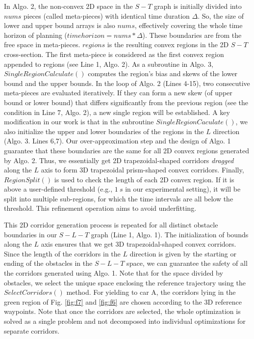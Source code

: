 \documentclass[journal,a4paper,onecolumn,12pt]{IEEEtran}
\begin{document}
In Algo. 2, the non-convex 2D space in the $S-T$ graph is initially divided into $nums$ pieces (called meta-pieces) with identical time duration $\Delta$. So, the size of lower and upper bound arrays is also $nums$, effectively covering the whole time horizon of planning ($time horizon = nums * \Delta$). These boundaries are from the free space in meta-pieces. $regions$ is the resulting convex regions in the 2D $S-T$ cross-section. The first meta-piece is considered as the first convex region appended to regions (see Line 1, Algo. 2). As a subroutine in Algo. 3, $SingleRegionCalculate()$ computes the region's bias and skews of the lower bound and the upper bounds. In the loop of Algo. 2 (Lines 4-15), two consecutive meta-pieces are evaluated iteratively. If they can form a new skew (of upper bound or lower bound) that differs significantly from the previous region (see the condition in Line 7, Algo. 2), a new single region will be established.
A key modification in our work is that in the subroutine $SingleRegionCaculate()$, we also initialize the upper and lower boundaries of the regions in the $L$ direction (Algo. 3. Lines 6,7). Our over-approximation step and the design of Algo. 1 guarantee that these boundaries are the same for all 2D convex regions generated by Algo. 2. Thus, we essentially get 2D trapezoidal-shaped corridors \textit{dragged} along the $L$ axis to form 3D trapezoidal prism-shaped convex corridors. Finally, $RegionSplit()$ is used to check the length of each 2D convex region. If it is above a user-defined threshold (e.g., $1\ s$ in our experimental setting), it will be split into multiple sub-regions, for which the time intervals are all below the threshold. This refinement operation aims to avoid underfitting.

This 2D corridor generation process is repeated for all distinct obstacle boundaries in our $S-L-T$ graph (Line 1, Algo. 1). The initialization of bounds along the $L$ axis ensures that we get 3D trapezoidal-shaped convex corridors. Since the length of the corridors in the $L$ direction is given by the starting or ending of the obstacles in the $S-L-T$ space, we can guarantee the safety of all the corridors generated using Algo. 1. Note that for the space divided by obstacles, we select the unique space enclosing the reference trajectory using the $SelectCorridors()$ method. For yielding to car A, the corridors lying in the green region of Fig. \ref{fig:f7} and \ref{fig:f6} are chosen according to the 3D reference waypoints.
Note that once the corridors are selected, the whole optimization is solved as a single problem and not decomposed into individual optimizations for separate corridors.
\end{document}
